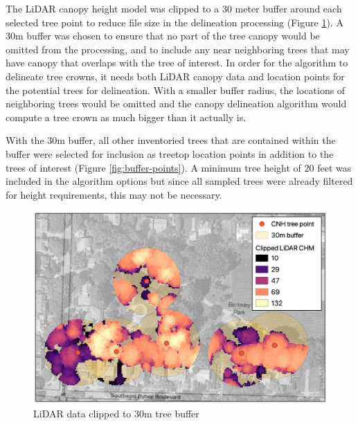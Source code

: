 \documentclass[12pt,twoside]{reedthesis}
\begin{document}
The LiDAR canopy height model was clipped to a 30 meter buffer around each selected tree point to reduce file size in the delineation processing (Figure \ref{fig:lidar-buffer}). A 30m buffer was chosen to ensure that no part of the tree canopy would be omitted from the processing, and to include any near neighboring trees that may have canopy that overlaps with the tree of interest. In order for the algorithm to delineate tree crowns, it needs both LiDAR canopy data and location points for the potential trees for delineation. With a smaller buffer radius, the locations of neighboring trees would be omitted and the canopy delineation algorithm would compute a tree crown as much bigger than it actually is.

With the 30m buffer, all other inventoried trees that are contained within the buffer were selected for inclusion as treetop location points in addition to the trees of interest (Figure \ref{fig:buffer-points}). A minimum tree height of 20 feet was included in the algorithm options but since all sampled trees were already filtered for height requirements, this may not be necessary.
\begin{figure}

{\centering \includegraphics[width=1\linewidth]{figure/lidar_buffer_scale} 

}

\caption{LiDAR data clipped to 30m tree buffer}\label{fig:lidar-buffer}
\end{figure}
\end{document}
